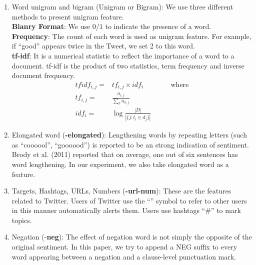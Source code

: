 \begin{enumerate}
\item Word unigram and bigram (Unigram or Bigram): We use three different methods to present unigram feature. \\
 \textbf{Bianry Format}: We use $0/1$ to indicate the presence of a word.\\ 
 \textbf{Frequency}: The count of each word is used as unigram feature. For example, if “good” appears twice in the Tweet, we set 2 to this word.\\
 \textbf{tf-idf}: It is a numerical statistic to reflect the importance of a word to a document. tf-idf is the product of two statistics, term frequency and inverse document frequency. 
  \begin{eqnarray*}
      tfidf_{i,j} = & tf_{i,j} \times idf_{i} & \qquad \text{where} \\
      tf_{i,j} = & \frac{n_{i,j}}{\sum_k n_{k,j}} & \\
      idf_i = & \log \frac{|D|}{|\{j: t_i \in d_j\}|} &
  \end{eqnarray*}   
  	\item Elongated word (\textbf{-elongated}): Lengthening words by repeating letters (such as “coooool”, “goooood”) is reported to be an strong indication of sentiment. Brody et al. (2011) reported that on average, one out of six sentences has word lengthening. In our experiment, we also take elongated word as a feature. 
   \item Targets, Hashtags, URLs, Numbers (\textbf{-url-num}): These are the features related to Twitter. Users of Twitter use the “\@” symbol to refer to other users in this manner automatically alerts them. Users use hashtags “\#” to mark topics. 
   \item Negation (-\textbf{neg}): The effect of negation word is not simply the opposite of the original sentiment. In this paper, we try to append a NEG suffix to every word appearing between a negation and a clause-level punctuation mark. 
  
\end{enumerate}


